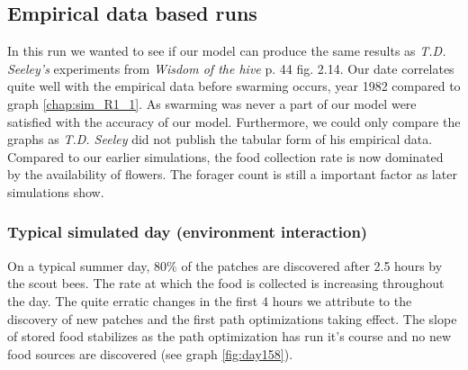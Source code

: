 \subsection{Empirical data based runs}
	In this run we wanted to see if our model can produce the same results as \textit{T.D. Seeley's} experiments from \textit{Wisdom of the hive} p. 44 fig. 2.14. Our date correlates quite well with the empirical data before swarming occurs, year 1982 compared to graph \ref{chap:sim_R1_1}. As swarming was never a part of our model were satisfied with the accuracy of our model. Furthermore, we could only compare the graphs as \textit{T.D. Seeley} did not publish the tabular form of his empirical data.\\
	Compared to our earlier simulations, the food collection rate is now dominated by the availability of flowers. The forager count is still a important factor as later simulations show.
	
	\subsubsection{Typical simulated day (environment interaction)}
		On a typical summer day, $80\%$ of the patches are discovered after 2.5 hours by the scout bees. The rate at which the food is collected is increasing throughout the day. The quite erratic changes in the first 4 hours we attribute to the discovery of new patches and the first path optimizations taking effect. The slope of stored food stabilizes as the path optimization has run it's course and no new food sources are discovered (see graph \ref{fig:day158}).\\
		
